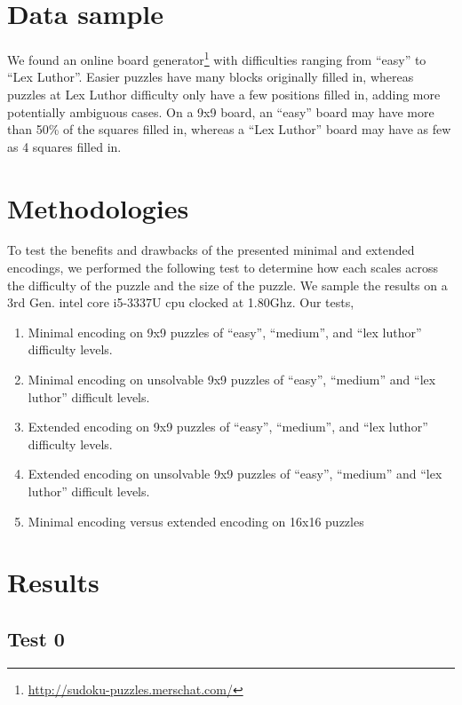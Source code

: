 \documentclass[conference,draftclsnofoot]{IEEEtran}
\begin{document}
\section{Data sample}
We found an online board
generator\footnote{\url{http://sudoku-puzzles.merschat.com/}} with difficulties
ranging from ``easy'' to ``Lex Luthor''. Easier puzzles have many blocks
originally filled in, whereas puzzles at Lex Luthor difficulty only have a few
positions filled in, adding more potentially ambiguous cases. On a 9x9 board,
an ``easy'' board may have more than 50\% of the squares filled in, whereas a
``Lex Luthor'' board may have as few as 4 squares filled in.

\section{Methodologies}
To test the benefits and drawbacks of the presented minimal and extended
encodings, we performed the following test to determine how each scales across
the difficulty of the puzzle and the size of the puzzle.
We sample the results on a 3rd Gen. intel core i5-3337U cpu clocked at 1.80Ghz.
Our tests,
\begin{enumerate}
	\item Minimal encoding on 9x9 puzzles of ``easy'', ``medium'', and
		``lex luthor'' difficulty levels.
	\item Minimal encoding on unsolvable 9x9 puzzles of ``easy'',
		``medium'' and ``lex luthor'' difficult levels.
	\item Extended encoding on 9x9 puzzles of ``easy'', ``medium'', and
		``lex luthor'' difficulty levels.
	\item Extended encoding on unsolvable 9x9 puzzles of ``easy'',
		``medium'' and ``lex luthor'' difficult levels.

	\item Minimal encoding versus extended encoding on 16x16 puzzles
\end{enumerate}

\section{Results}

\subsection{Test 0}

\end{document}
